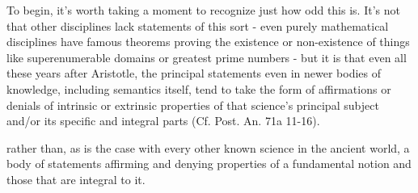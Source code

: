 \documentclass[]{article}
\begin{document}
To begin, it's worth taking a moment to recognize just how odd this is. 
It's not that other disciplines lack statements of this sort - even purely mathematical disciplines have famous theorems proving the existence or non-existence of things like superenumerable domains or greatest prime numbers - 
but it is that even all these years after Aristotle, the principal statements even in newer bodies of knowledge, including semantics itself, tend to take the form of affirmations or denials of intrinsic or extrinsic properties of that science's principal subject and/or its specific and integral parts (Cf. Post. An. 71a 11-16).

rather than, 
as is the case with every other known science in the ancient world,
a body of statements affirming and denying properties of a fundamental notion and those that are integral to it. 


\end{document}
